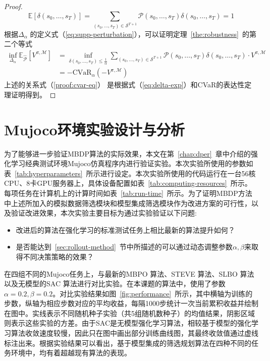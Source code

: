 \begin{proof}
\begin{equation}
    \mathbb{E}\left[\delta(s_0,\ldots,s_T)\right] = \sum_{(s_0,\ldots,s_T)\in\mathcal{S}^{T+1}}\mathcal{P}(s_0,\ldots,s_T)\delta(s_0,\ldots,s_T) = 1
\end{equation}
根据$\Delta_\alpha$ 的定义式（\ref{eq:supp-perturbation}），可以证明定理~\ref{the:robustness}~的第二个等式
\begin{align}
    \inf\limits_{\Delta_\alpha}\mathbb{E}_{\hat{\mathcal{P}}}[V^{\pi,\mathcal{M}}] &= \inf\limits_{\delta(s_0,\ldots,s_T)\leq\frac{1}{\alpha}}\sum_{(s_0,\ldots,s_T)\in\mathcal{S}^{T+1}}\mathcal{P}(s_0,\ldots,s_T)\delta(s_0,\ldots,s_T)\cdot V^{\pi,\mathcal{M}}\\
    &=-\mathrm{CVaR}_\alpha(-V^{\pi,\mathcal{M}})\label{proof:cvar-eq}
\end{align}
上述的关系式（\ref{proof:cvar-eq}） 是根据式（\ref{eq:delta-exp}）和CVaR的表达性定理\cite{chow2015risk}证明得到。

\end{proof}

\section{Mujoco环境实验设计与分析}

为了能够进一步验证MBDP算法的实际效果，本文在第~\ref{chap:dper}~章中介绍的强化学习经典测试环境Mujoco仿真程序内进行验证实验。本次实验所使用的参数如表~\ref{tab:hyperparameters}~所示进行设定。本次实验所使用的代码运行在一台56核CPU、8卡GPU服务器上，具体设备配置如表~\ref{tab:computing-resources}~所示。每项任务在计算机上的计算时间如表~\ref{tab:run-time}~所示。为了证明MBDP方法中上述所加入的模拟数据筛选模块和模型集成筛选模块作为改进方案的可行性，以及验证改进效果，本次实验主要目标为通过实验验证以下问题:

\begin{itemize}
    \item 改进后的算法在强化学习的标准测试任务上相比最新的算法提升如何？
    \item 是否能达到~\ref{sec:rollout-method}~节中所描述的可以通过动态调整参数$\alpha,\beta$来取得不同决策策略的效果？
\end{itemize}

在四组不同的Mujoco任务上，与最新的MBPO \cite{janner2019trust}算法、STEVE \cite{buckman2018sample}算法、SLBO \cite{Luo2019AlgorithmicGuarantees}算法以及无模型的SAC \cite{haarnoja2018soft}算法进行对比实验。在本课题的算法中，使用了参数$\alpha=0.2, \beta=0.2$。对比实验结果如图~\ref{fig:performance}~所示，其中横轴为训练的步数，纵轴为相应步数对应的平均收益，每隔1000步统计一次当前累积收益并绘制在图中。实线表示不同随机种子实验（共5组随机数种子）的均值结果，阴影区域则表示这些实验的方差。由于SAC是无模型强化学习算法，相较基于模型的强化学习算法收敛速度较慢，因此只在图中画出部分训练曲线图，其最终收敛值通过虚线标注出来。根据实验结果可以看出，基于模型集成的筛选规划算法在四种不同的任务环境中，均有着超越现有算法的表现。

